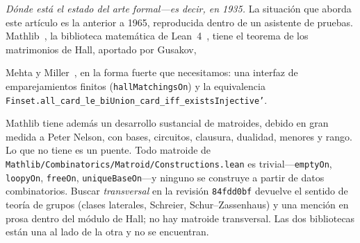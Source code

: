 \documentclass[11pt]{article}
\newcommand{\lean}[1]{\texttt{#1}}
\begin{document}
\emph{Dónde está el estado del arte formal---es decir, en 1935.} La situación que aborda este
artículo es la anterior a 1965, reproducida dentro de un asistente de pruebas.
Mathlib~\cite{mathlib}, la biblioteca matemática de Lean~4~\cite{lean4}, tiene el teorema de los
matrimonios de Hall, aportado por Gusakov,
{\sloppy Mehta y Miller~\cite{gusakov}, en la forma fuerte que necesitamos: una interfaz de
emparejamientos finitos (\lean{hallMatchingsOn}) y la equivalencia
\lean{Finset.all\_card\_le\_biUnion\_card\_iff\_existsInjective'}.\par} Mathlib tiene además un
desarrollo sustancial de matroides, debido en gran medida a Peter Nelson, con bases, circuitos,
clausura, dualidad, menores y rango. Lo que no tiene es un puente. Todo matroide de
\lean{Mathlib/Combinatorics/Matroid/Constructions.lean} es trivial---\lean{emptyOn},
\lean{loopyOn}, \lean{freeOn}, \lean{uniqueBaseOn}---y ninguno se construye a partir de datos
combinatorios. Buscar \emph{transversal} en la revisión \lean{84fdd0bf} devuelve el sentido de
teoría de grupos (clases laterales, Schreier, Schur--Zassenhaus) y una mención en prosa dentro del
módulo de Hall; no hay matroide transversal. Las dos bibliotecas están una al lado de la otra y no
se encuentran.
\end{document}
